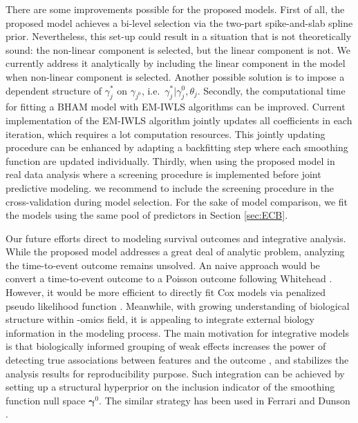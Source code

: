 \documentclass[AMA,STIX1COL,]{WileyNJD-v2}
\begin{document}
There are some improvements possible for the proposed models. First of
all, the proposed model achieves a bi-level selection via the two-part
spike-and-slab spline prior. Nevertheless, this set-up could result in a
situation that is not theoretically sound: the non-linear component is
selected, but the linear component is not. We currently address it
analytically by including the linear component in the model when
non-linear component is selected. Another possible solution is to impose
a dependent structure of \(\gamma_{j}^*\) on \(\gamma_{j^{0}}\),
i.e.~\(\gamma_j^*|\gamma_{j}^{0}, \theta_j\). Secondly, the
computational time for fitting a BHAM model with EM-IWLS algorithms can
be improved. Current implementation of the EM-IWLS algorithm jointly
updates all coefficients in each iteration, which requires a lot
computation resources. This jointly updating procedure can be enhanced
by adapting a backfitting step \citep{Hastie1987} where each smoothing
function are updated individually. Thirdly, when using the proposed
model in real data analysis where a screening procedure is implemented
before joint predictive modeling. we recommend to include the screening
procedure in the cross-validation during model selection.
\citep{Friedman2017} For the sake of model comparison, we fit the models
using the same pool of predictors in Section \ref{sec:ECB}.

Our future efforts direct to modeling survival outcomes and integrative
analysis. While the proposed model addresses a great deal of analytic
problem, analyzing the time-to-event outcome remains unsolved. An naive
approach would be convert a time-to-event outcome to a Poisson outcome
following Whitehead \citep{Whitehead1980}. However, it would be more
efficient to directly fit Cox models via penalized pseudo likelihood
function \citep{Simon2011}. Meanwhile, with growing understanding of
biological structure within -omics field, it is appealing to integrate
external biology information in the modeling process. The main
motivation for integrative models is that biologically informed grouping
of weak effects increases the power of detecting true associations
between features and the outcome \citep{Peterson2016}, and stabilizes
the analysis results for reproducibility purpose. Such integration can
be achieved by setting up a structural hyperprior on the inclusion
indicator of the smoothing function null space
\(\boldsymbol{\gamma}^0\). The similar strategy has been used in Ferrari
and Dunson \citep{Ferrari2020}.

\newpage
\end{document}
